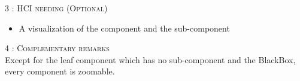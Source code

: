 \begin{flushleft}
    \BlackLine
    \textsc{\Large 3 : HCI needing (Optional)}\\[0.3cm]
    \begin{itemize}
        \item A visualization of the component and the sub-component
    \end{itemize}

    \BlackLine
    \textsc{\Large 4 : Complementary remarks}\\[0.3cm]

    Except for the leaf component which has no sub-component and the BlackBox, every component is zoomable.

\end{flushleft}
